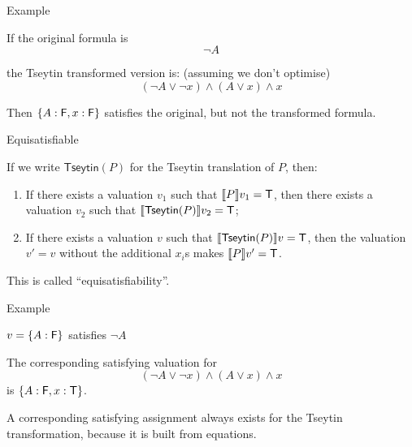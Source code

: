 \documentclass[xetex,aspectratio=169,14pt,hyperref={pdfpagelabels=true,pdflang={en-GB}}]{beamer}
\begin{document}
\begin{frame}
  {Example}

  If the original formula is
  \begin{displaymath}
    \lnot A
  \end{displaymath}

  the Tseytin transformed version is: \textcolor{black!60}{(assuming
    we don't optimise)}
  \begin{displaymath}
    (\lnot A \lor \lnot x) \land (A \lor x) \land x
  \end{displaymath}

  Then $\{A : \mathsf{F}, x : \mathsf{F}\}$ satisfies the
  original, but not the transformed formula.
\end{frame}

\begin{frame}
  {Equisatisfiable}

  If we write $\mathsf{Tseytin}(P)$ for the Tseytin translation of
  $P$, then:
  \begin{enumerate}
  \item If there exists a valuation $v_1$ such that $\llbracket P \rrbracket v_1 = \mathsf{T}$,
    then there exists a valuation $v_2$ such that
    $\llbracket \mathsf{Tseytin}(P) \rrbracket v_2 = \mathsf{T}$;
  \item If there exists a valuation $v$ such that
    $\llbracket \mathsf{Tseytin}(P) \rrbracket v = \mathsf{T}$, then the valuation $v' = v$
    without the additional $x_i$s makes $\llbracket P \rrbracket v' = \mathsf{T}$.
  \end{enumerate}

  \bigskip

  This is called ``equisatisfiability''.
\end{frame}

\begin{frame}
  {Example}

  $v = \{A : \mathsf{F}\}$ satisfies $\lnot A$

  \bigskip

  The corresponding satisfying valuation for
  \begin{displaymath}
    (\lnot A \lor \lnot x) \land (A \lor x) \land x
  \end{displaymath}
  is $\{A : \mathsf{F}, x : \mathsf{T}\}$.

  \bigskip

  A corresponding satisfying assignment always exists for the Tseytin
  transformation, because it is built from equations.
\end{frame}
\end{document}
